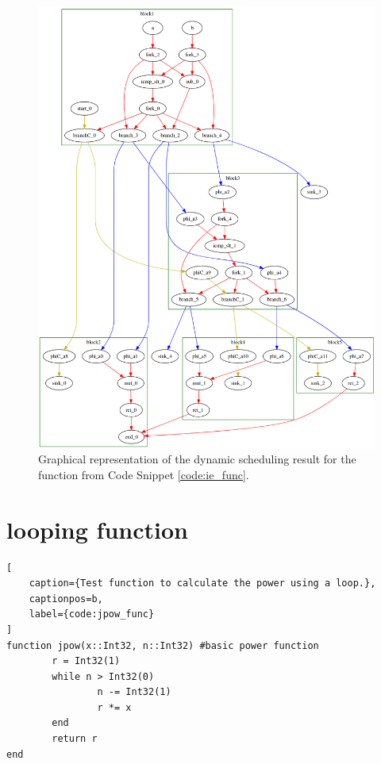 \begin{figure}[htb!]
    \centering
    \includegraphics[width=\textwidth]{Images/ie_dot.png}
    \caption{Graphical representation of the dynamic scheduling result for the  function from Code Snippet \ref{code:ie_func}.}
    \label{fig:ie_dot}
\end{figure}

\pagebreak

\section{looping  function}
\label{sec:pow}

\begin{lstlisting}[
    caption={Test function to calculate the power using a loop.},
    captionpos=b, 
    label={code:jpow_func}
]
function jpow(x::Int32, n::Int32) #basic power function
        r = Int32(1)
        while n > Int32(0)
                n -= Int32(1)
                r *= x
        end
        return r
end
\end{lstlisting}

